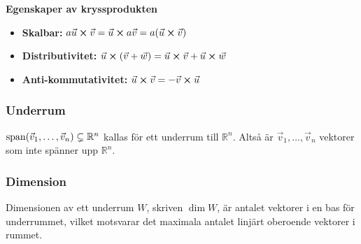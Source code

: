 \begin{features}
	\textbf{Egenskaper av kryssprodukten}

	\begin{itemize}
		\item \textbf{Skalbar:} $a\vec{u}\cross\vec{v}=\vec{u}\cross a\vec{v}=a(\vec{u}\cross\vec{v})$
		\item \textbf{Distributivitet:} $\vec{u}\cross(\vec{v}+\vec{w})=\vec{u}\cross\vec{v}+\vec{u}\cross\vec{w}$
		\item \textbf{Anti-kommutativitet:} $\vec{u}\cross\vec{v}=-\vec{v}\cross\vec{u}$
	\end{itemize}
\end{features}

\subsubsection{Underrum}

$\operatorname{span}(\vec{v}_1,\dots,\vec{v}_n)\subsetneq\mathbb{R}^n$ kallas för ett underrum
till $\mathbb{R}^n$. Altså är $\vec{v}_1,\dots,\vec{v}_n$ vektorer som inte spänner
upp $\mathbb{R}^n$.

\subsubsection{Dimension}
Dimensionen av ett underrum $W$, skriven $\dim W$, är antalet vektorer i en bas
för underrummet, vilket motsvarar det maximala antalet linjärt oberoende vektorer
i rummet.

